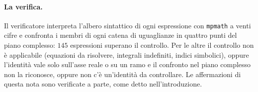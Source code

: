 \paragraph{La verifica.}
Il verificatore interpreta l'albero sintattico di ogni espressione con
\texttt{mpmath} a venti cifre e confronta i membri di ogni catena di
uguaglianze in quattro punti del piano complesso: $145$ espressioni superano
il controllo. Per le altre il controllo non \`e applicabile (equazioni da
risolvere, integrali indefiniti, indici simbolici), oppure l'identit\`a vale
solo sull'asse reale o su un ramo e il confronto nel piano complesso non la
riconosce, oppure non c'\`e un'identit\`a da controllare. Le affermazioni di questa nota sono verificate a parte,
come detto nell'introduzione.
